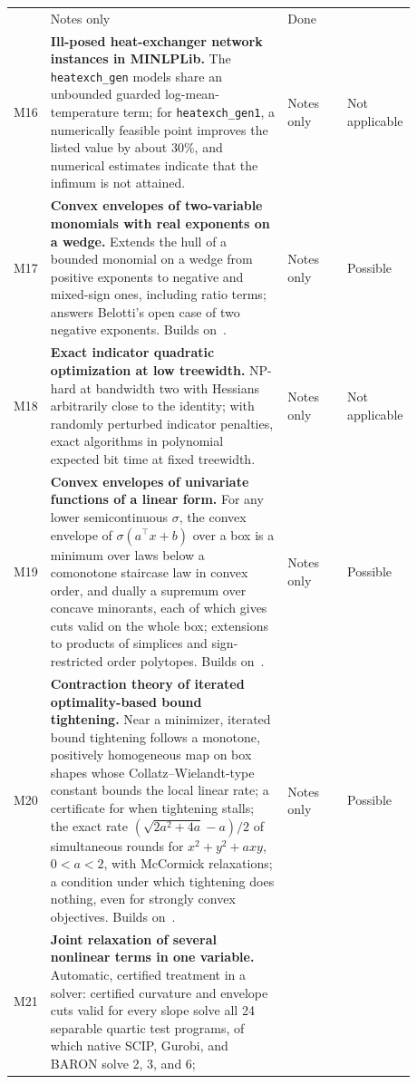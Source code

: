 \begin{small}
\begin{longtable}{@{}l>{\raggedright\arraybackslash}p{0.60\linewidth}%
  >{\raggedright\arraybackslash}p{0.15\linewidth}%
  >{\raggedright\arraybackslash}p{0.13\linewidth}@{}}
  & Notes only & Done \\
M16 & \textbf{Ill-posed heat-exchanger network instances in MINLPLib.}
  The \texttt{heatexch\_gen} models share an unbounded guarded
  log-mean-temperature term; for \texttt{heatexch\_gen1}, a numerically
  feasible point improves the listed value by about 30\%, and numerical
  estimates indicate that the infimum is not attained.
  & Notes only & Not applicable \\
M17 & \textbf{Convex envelopes of two-variable monomials with real exponents
  on a wedge.}
  Extends the hull of a bounded monomial on a wedge from positive exponents to
  negative and mixed-sign ones, including ratio terms; answers Belotti's open
  case of two negative exponents.
  Builds on~\citep{belotti2025monomials}.
  & Notes only & Possible \\
M18 & \textbf{Exact indicator quadratic optimization at low treewidth.}
  NP-hard at bandwidth two with Hessians arbitrarily close to the identity;
  with randomly perturbed indicator penalties, exact algorithms in polynomial
  expected bit time at fixed treewidth.
  & Notes only & Not applicable \\
M19 & \textbf{Convex envelopes of univariate functions of a linear form.}
  For any lower semicontinuous $\sigma$, the convex envelope of
  $\sigma(a^\top x+b)$ over a box is a minimum over laws below a comonotone
  staircase law in convex order, and dually a supremum over concave
  minorants, each of which gives cuts valid on the whole box; extensions to
  products of simplices and sign-restricted order polytopes.
  Builds on~\citep{mao2015aggregation}.
  & Notes only & Possible \\
M20 & \textbf{Contraction theory of iterated optimality-based bound
  tightening.}
  Near a minimizer, iterated bound tightening follows a monotone, positively
  homogeneous map on box shapes whose Collatz--Wielandt-type constant bounds
  the local linear rate; a certificate for when tightening stalls; the exact
  rate $(\sqrt{2a^2+4a}-a)/2$ of simultaneous rounds for $x^2+y^2+axy$,
  $0<a<2$, with McCormick relaxations; a condition under which tightening
  does nothing, even for strongly convex objectives.
  Builds on~\citep{caprara2010domain}.
  & Notes only & Possible \\
M21 & \textbf{Joint relaxation of several nonlinear terms in one variable.}
  Automatic, certified treatment in a solver: certified curvature and
  envelope cuts valid for every slope solve all 24 separable quartic test
  programs, of which native SCIP, Gurobi, and BARON solve 2, 3, and 6;

\end{longtable}
\end{small}
